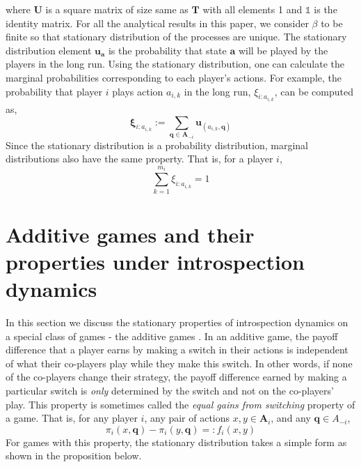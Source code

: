 \documentclass[11pt]{article}
\theoremstyle{plainCl1}
\theoremstyle{plainCl2}
\newcommand{\A}{\mathbf{A}}
\newcommand{\abf}{\mathbf{a}}
\newcommand{\qbf}{\mathbf{q}}
\newcommand{\T}{\mathbf{T}}
\newcommand{\ubf}{\mathbf{u}}
\begin{document}
where $\mathbf{U}$ is a square matrix of size same as $\T$ with all elements 1 and $\mathbb{1}$ is the identity matrix. For all the analytical results in this paper, we consider $\beta$ to be finite so that stationary distribution of the processes are unique. The stationary distribution element $\ubf_\abf$ is the probability that state $\abf$ will be played by the players in the long run. Using the stationary distribution, one can calculate the marginal probabilities corresponding to each player's actions. For example, the probability that player $i$ plays action $a_{i,k}$ in the long run, $\xi_{i:a_{i,k}}$, can be computed as,
\begin{equation}
\mathbf{\xi}_{i:a_{i,k}} := \sum_{\qbf \in \A_{-i}} \ubf_{(a_{i,k}, \qbf)}
\label{Eq:marginal-definition}
\end{equation}
\noindent Since the stationary distribution is a probability distribution, marginal distributions also have the same property. That is, for a player $i$, 
\begin{equation}
\sum_{k = 1}^{m_i} \xi_{i:a_{i,k}}= 1
\label{Eq:marginal-prob-dist}
\end{equation}
\section*{Additive games and their properties under introspection dynamics}
In this section we discuss the stationary properties of introspection dynamics on a special class of games - the additive games \cite{pena2014gains, mcavoy2015asymmetric}. In an additive game, the payoff difference that a player earns by making a switch in their actions is independent of what their co-players play while they make this switch. In other words, if none of the co-players change their strategy, the payoff difference earned by making a particular switch is \emph{only} determined by the switch and not on the co-players' play. This property is sometimes called the \emph{equal gains from switching} \cite{pena2014gains} property of a game. That is, for any player $i$, any pair of actions $x,y \in \A_i$, and any $\qbf \in A_{-i}$,
\begin{equation}
\pi_i(x, \qbf) - \pi_i(y, \qbf) =: f_i(x,y) 
\end{equation}
\noindent For games with this property, the stationary distribution takes a simple form as shown in the proposition below.
\end{document}
